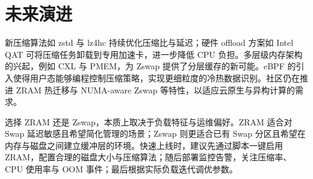 \chapter{未来演进}
新压缩算法如 zstd 与 lz4hc 持续优化压缩比与延迟；硬件 offload 方案如 Intel QAT 可将压缩任务卸载到专用加速卡，进一步降低 CPU 负担。多层级内存架构的兴起，例如 CXL 与 PMEM，为 Zswap 提供了分层缓存的新可能。eBPF 的引入使得用户态能够编程控制压缩策略，实现更细粒度的冷热数据识别。社区仍在推进 ZRAM 热迁移与 NUMA-aware Zswap 等特性，以适应云原生与异构计算的需求。\par
选择 ZRAM 还是 Zswap，本质上取决于负载特征与运维偏好。ZRAM 适合对 Swap 延迟敏感且希望简化管理的场景；Zswap 则更适合已有 Swap 分区且希望在内存与磁盘之间建立缓冲层的环境。快速上线时，建议先通过脚本一键启用 ZRAM，配置合理的磁盘大小与压缩算法；随后部署监控告警，关注压缩率、CPU 使用率与 OOM 事件；最后根据实际负载迭代调优参数。\par
